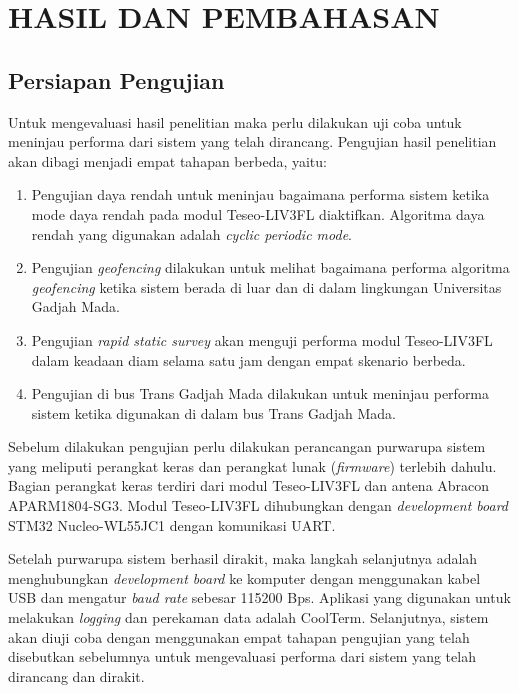 \chapter{HASIL DAN PEMBAHASAN}

\section{Persiapan Pengujian}
Untuk mengevaluasi hasil penelitian maka perlu dilakukan uji coba untuk meninjau performa dari sistem yang telah dirancang. Pengujian hasil penelitian akan dibagi menjadi empat tahapan berbeda, yaitu:

\begin{enumerate}
	\item Pengujian daya rendah untuk meninjau bagaimana performa sistem ketika mode daya rendah pada modul Teseo\hyp{}LIV3FL diaktifkan. Algoritma daya rendah yang digunakan adalah \textit{cyclic periodic mode}.
	\item Pengujian \textit{geofencing} dilakukan untuk melihat bagaimana performa algoritma \textit{geofencing} ketika sistem berada di luar dan di dalam lingkungan Universitas Gadjah Mada.
	\item Pengujian \textit{rapid static survey} akan menguji performa modul Teseo\hyp{}LIV3FL dalam keadaan diam selama satu jam dengan empat skenario berbeda.
	\item Pengujian di bus Trans Gadjah Mada dilakukan untuk meninjau performa sistem ketika digunakan di dalam bus Trans Gadjah Mada.
\end{enumerate}

Sebelum dilakukan pengujian perlu dilakukan perancangan purwarupa sistem yang meliputi perangkat keras dan perangkat lunak (\textit{firmware}) terlebih dahulu. Bagian perangkat keras terdiri dari modul Teseo\hyp{}LIV3FL dan antena Abracon APARM1804-SG3. Modul Teseo\hyp{}LIV3FL dihubungkan dengan \textit{development board} STM32 Nucleo-WL55JC1 dengan komunikasi UART.

Setelah purwarupa sistem berhasil dirakit, maka langkah selanjutnya adalah menghubungkan \textit{development board} ke komputer dengan menggunakan kabel USB dan mengatur \textit{baud rate} sebesar 115200 Bps. Aplikasi yang digunakan untuk melakukan \textit{logging} dan perekaman data adalah CoolTerm. Selanjutnya, sistem akan diuji coba dengan menggunakan empat tahapan pengujian yang telah disebutkan sebelumnya untuk mengevaluasi performa dari sistem yang telah dirancang dan dirakit.

